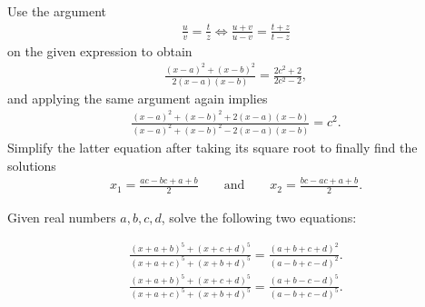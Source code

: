 \begin{solution}
    Use the argument
    \begin{align*}
        \frac{u}{v} = \frac{t}{z} \iff \frac{u+v}{u-v} = \frac{t+z}{t-z}
    \end{align*}
    on the given expression to obtain
    \begin{align*}
        \frac{(x-a)^2+(x-b)^2}{2(x-a)(x-b)} = \frac{2c^2+2}{2c^2-2},
    \end{align*}
    and applying the same argument again implies
    \begin{align*}
        \frac{(x-a)^2+(x-b)^2+2(x-a)(x-b)}{(x-a)^2+(x-b)^2-2(x-a)(x-b)} = c^2.
    \end{align*}
    Simplify the latter equation after taking its square root to finally find the solutions
    \begin{align*}
        x_1 = \frac{ac-bc+a+b}{2} \qquad \text{and} \qquad x_2 = \frac{bc-ac+a+b}{2}.
    \end{align*}
\end{solution}


\begin{question}
    Given real numbers $a,b,c,d$, solve the following two equations:
    \begin{tasks}
    \task
    \begin{align*}
        \frac{(x+a+b)^5+(x+c+d)^5}{(x+a+c)^5+(x+b+d)^5} = \frac{(a+b+c+d)^2}{(a-b+c-d)^2}.
    \end{align*}
    \task 
    \begin{align*}
        \frac{(x+a+b)^5+(x+c+d)^5}{(x+a+c)^5+(x+b+d)^5} = \frac{(a+b-c-d)^5}{(a-b+c-d)^5}.
    \end{align*}
    \end{tasks}
\end{question}

